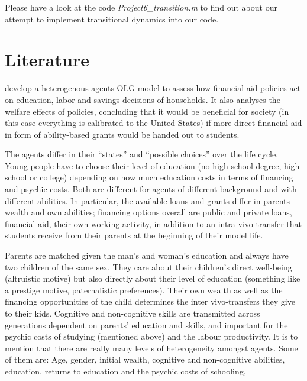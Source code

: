 \documentclass[12pt,a4paper]{article}
\begin{document}
Please have a look at the code \textit{Project6\_transition.m} to find out about our attempt to implement transitional dynamics into our code. 


\section{Literature}
\cite{abbott2019education} develop a heterogenous agents OLG model to assess how financial aid policies act on education, labor and savings decisions of households. It also analyses the welfare effects of policies, concluding that it would be beneficial for society (in this case everything is calibrated to the United States) if more direct financial aid in form of ability-based grants would be handed out to students. 

The agents differ in their “states” and “possible choices” over the life cycle. Young people have to choose their level of education (no high school degree, high school or college) depending on how much education costs in terms of financing and psychic costs. Both are different for agents of different background and with different abilities. In particular, the available loans and grants differ in parents wealth and own abilities; financing options overall are public and private loans, financial aid, their own working activity, in addition to an intra-vivo transfer that students receive from their parents at the beginning of their model life. 

Parents are matched given the man’s and woman’s education and always have two children of the same sex. They care about their children’s direct well-being (altruistic motive) but also directly about their level of education (something like a prestige motive, paternalistic preferences). Their own wealth as well as the financing opportunities of the child determines the inter vivo-transfers they give to their kids. Cognitive and non-cognitive skills are transmitted across generations dependent on parents’ education and skills, and important for the psychic costs of studying (mentioned above) and the labour productivity. 
It is to mention that there are really many levels of heterogeneity amongst agents. Some of them are: Age, gender, initial wealth, cognitive and non-cognitive abilities, education, returns to education and the psychic costs of schooling,
\end{document}
